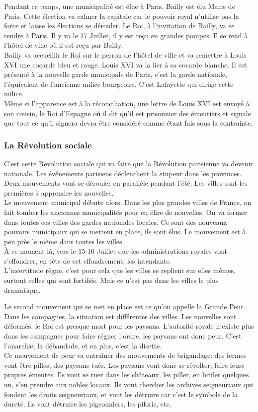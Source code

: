 \documentclass[10pt, a4paper, openany]{book}
\begin{document}
Pendant ce temps, une municipalité est élue à Paris. Bailly est élu Maire de Paris. Cette élection va calmer la capitale car le pouvoir royal n'utilise pas la force et laisse les élections se dérouler. Le Roi, à l'invitation de Bailly, va se rendre à Paris. Il y va le 17 Juillet, il y est reçu en grandes pompes. Il se rend à l'hôtel de ville où il est reçu par Bailly. \\
Bailly va accueillir le Roi sur le perron de l'hôtel de ville et va remettre à Louis XVI une cocarde bleu et rouge. Louis XVI va la lier à sa cocarde blanche. Il est présenté à la nouvelle garde municipale de Paris, c'est la garde nationale, l'équivalent de l'ancienne milice bourgeoise. C'est Lafayette qui dirige cette milice. \\
Même si l'apparence est à la réconciliation, une lettre de Louis XVI est envoyé à son cousin, le Roi d'Espagne où il dit qu'il est prisonnier des émeutiers et signale que tout ce qu'il signera devra être considéré comme étant fais sous la contrainte. 

\subsubsection{La Révolution sociale}

C'est cette Révolution sociale qui va faire que la Révolution parisienne va devenir nationale. Les événements parisiens déclenchent la stupeur dans les provinces. Deux mouvements vont se dérouler en parallèle pendant l'été. Les villes sont les premières à apprendre les nouvelles. \\
Le mouvement municipal débute alors. Dans les plus grandes villes de France, on fait tomber les anciennes municipalités pour en élire de nouvelles. On va former dans toutes ces villes des gardes nationales locales. Ce sont des nouveaux pouvoirs municipaux qui se mettent en place, ils sont élus. Le mouvement est à peu près le même dans toutes les villes. \\
À ce moment là, vers le 15-16 Juillet que les administrations royales vont s'effondrer, en tête de cet effondrement: les intendants. \\
L'incertitude règne, c'est pour cela que les villes se replient sur elles mêmes, surtout celles qui sont fortifiés. Mais ce n'est pas dans les villes le plus dramatique.


Le second mouvement qui se met en place est ce qu'on appelle la Grande Peur. Dans les campagnes, la situation est différentes des villes. Les nouvelles sont déformés, le Roi est presque mort pour les paysans. L'autorité royale n'existe plus dans les campagnes pour faire régner l'ordre, les paysans ont donc peur. C'est l'anarchie, la débandade, et en plus, c'est la disette. \\
Ce mouvement de peur va entraîner des mouvements de brigandage: des fermes vont être pillés, des paysans tués. Les paysans vont donc se révolter, faire leurs propres émeutes. Ils vont se ruer dans les châteaux, les piller, en brûler quelques un, s'en prendre aux nobles locaux. Ils vont chercher les archives seigneuriaux qui fondent les droits seigneuriaux, et vont les détruire car c'est le symbole de la dureté. Ils vont détruire les pigeonniers, les piloris, etc.
\end{document}
